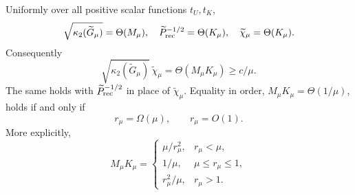 \begin{theorem}
\label{thm:prec-general-scalar-frontier}
Uniformly over all positive scalar functions $t_U,t_K$,
\begin{equation}
 \sqrt{\kappa_2(\widetilde G_\mu)}=\Theta(M_\mu),\quad
 \widetilde P_{\rm rec}^{-1/2}=\Theta(K_\mu),\quad
 \widetilde\chi_\mu=\Theta(K_\mu).                      \label{eq:prec-general-frontier}
\end{equation}
Consequently
\begin{equation}
 \sqrt{\kappa_2(\widetilde G_\mu)}\,\widetilde\chi_\mu
 =\Theta(M_\mu K_\mu)\geq c/\mu.                       \label{eq:prec-general-product}
\end{equation}
The same holds with $\widetilde P_{\rm rec}^{-1/2}$ in place of
$\widetilde\chi_\mu$.  Equality in order,
$M_\mu K_\mu=\Theta(1/\mu)$, holds if and only if
\begin{equation}
 r_\mu=\Omega(\mu),\qquad r_\mu=O(1).                    \label{eq:prec-equality-class}
\end{equation}
More explicitly,
\begin{equation}
 M_\mu K_\mu=
 \begin{cases}
  \mu/r_\mu^2,&r_\mu<\mu,\\
  1/\mu,&\mu\leq r_\mu\leq1,\\
  r_\mu^2/\mu,&r_\mu>1.
 \end{cases}                                             \label{eq:prec-three-cases}
\end{equation}
\end{theorem}

